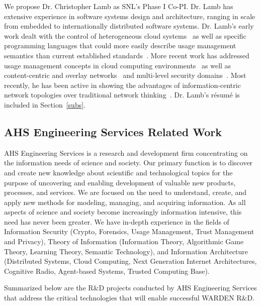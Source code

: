 \documentclass{sbir}
\begin{document}
We propose Dr. Christopher Lamb as SNL's Phase I Co-PI. Dr. Lamb has extensive experience in software systems design and architecture, ranging in scale from embedded to internationally distributed software systems. Dr. Lamb's early work dealt with the control of heterogeneous cloud systems~\cite{LaJaHeAb:11} as well as specific programming languages that could more easily describe usage management semantics than current established standards~\cite{LaJaBoNaHe:11}. More recent work has addressed usage management concepts in cloud computing environments~\cite{JaLaHe:11,JaLaHe:12} as well as content-centric and overlay networks~\cite{LaHe:12b} and multi-level security domains~\cite{LaHe:12}. Most recently, he has been active in showing the advantages of information-centric network topologies over traditional network thinking~\cite{LaHe:13}. Dr. Lamb's r\'esum\'e is included in Section~\ref{subs}.

\subsection{AHS Engineering Services Related Work}
AHS Engineering Services is a research and development firm concentrating on the information needs of science and society. Our primary function is to discover and create new knowledge about scientific and technological topics for the purpose of uncovering and enabling development of valuable new products, processes, and services. We are focused on the need to understand, create, and apply new methods for modeling, managing, and acquiring information. As all aspects of science and society become increasingly information intensive, this need has never been greater. We have in-depth experience in the fields of Information Security (Crypto, Forensics, Usage Management, Trust Management and Privacy), Theory of Information (Information Theory, Algorithmic Game Theory, Learning Theory, Semantic Technology), and Information Architecture (Distributed Systems, Cloud Computing, Next Generation Internet Architectures, Cognitive Radio, Agent-based Systems, Trusted Computing Base).

Summarized below are the R\&D projects conducted by AHS Engineering Services that address the critical technologies that will enable successful WARDEN R\&D.
\end{document}
